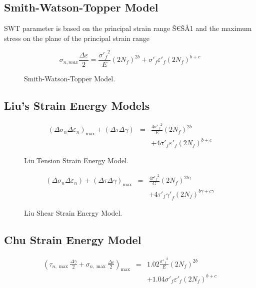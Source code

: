 \documentclass[preprint,5p,twocolumn,11pt,sort&compress]{elsarticle}
\begin{document}
\subsection{Smith-Watson-Topper Model}
SWT parameter is based on the principal strain range Š€ŠÅ1 and the maximum stress on the plane of the principal
strain range

\[{\sigma _{n,max}}\frac{{\Delta \varepsilon }}{2} = \frac{{{{\sigma '}_f}^2}}{E}{\left( {2{N_f}} \right)^{2b}} + {\sigma '_f}{\varepsilon '_f}{\left( {2{N_f}} \right)^{b + c}}\]
\begin{figure}[!htp]
\caption{Smith-Watson-Topper Model.}
\label{Fig:NF-NP-SWT}
\end{figure}

\subsection{Liu's Strain Energy Models}
\begin{eqnarray*}
{\left( {\Delta {\sigma _n}\Delta {\varepsilon _n}} \right)_{\max }} + \left( {\Delta \tau \Delta \gamma } \right) &=& \frac{{4{{\sigma '}_f}^2}}{E}{\left( {2{N_f}} \right)^{2b}}
\\
& & + 4{{\sigma '}_f}{{\varepsilon '}_f}{\left( {2{N_f}} \right)^{b + c}}
\end{eqnarray*}

\begin{figure}[!htp]
\caption{Liu Tension Strain Energy Model.}
\label{Fig:NF-NP-Liu}
\end{figure}

\begin{eqnarray*}
\left( {\Delta {\sigma _n}\Delta {\varepsilon _n}} \right) + {\left( {\Delta \tau \Delta \gamma } \right)_{\max }} &=& \frac{{4{{\tau '}_f}^2}}{G}{\left( {2{N_f}} \right)^{2b\gamma }}
\\
&& + 4{{\tau '}_f}{{\gamma '}_f}{\left( {2{N_f}} \right)^{b\gamma  + c\gamma }}
\end{eqnarray*}

\begin{figure}[!htp]
\caption{Liu Shear Strain Energy Model.}
\label{Fig:NF-NP-Liu2}
\end{figure}

\subsection{Chu Strain Energy Model}
\begin{eqnarray*}
{\left( {{\tau _{n,\max }}\frac{{\Delta \gamma }}{2} + {\sigma _{n,\max }}\frac{{\Delta \varepsilon }}{2}} \right)_{\max }} &=& 1.02\frac{{{{\sigma '}_f}^2}}{E}{\left( {2{N_f}} \right)^{2b}} \\
&& + 1.04{{\sigma '}_f}{{\varepsilon '}_f}{\left( {2{N_f}} \right)^{b + c}}
\end{eqnarray*}
\end{document}
